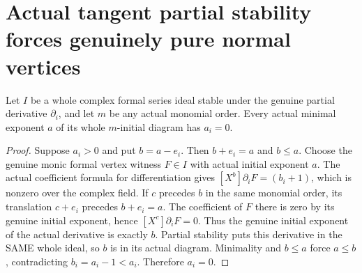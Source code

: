 \section{Actual tangent partial stability forces genuinely pure normal vertices}

\begin{theorem}
\label{hir:actual-pderiv-stable-vertex-coordinate-zero}
\leanok
Let $I$ be a whole complex formal series ideal stable under the genuine
partial derivative $\partial_i$, and let $m$ be any actual monomial order.
Every actual minimal exponent $a$ of its whole $m$-initial diagram has
$a_i=0$.
\end{theorem}
\begin{proof}
Suppose $a_i>0$ and put $b=a-e_i$. Then $b+e_i=a$ and $b\le a$.
Choose the genuine monic formal vertex witness $F\in I$ with actual initial
exponent $a$. The actual coefficient formula for differentiation gives
$[X^b]\partial_iF=(b_i+1)$, which is nonzero over the complex field. If
$c$ precedes $b$ in the same monomial order, its translation $c+e_i$
precedes $b+e_i=a$. The coefficient of $F$ there is zero by its genuine
initial exponent, hence $[X^c]\partial_iF=0$. Thus the genuine initial
exponent of the actual derivative is exactly $b$. Partial stability puts
this derivative in the SAME whole ideal, so $b$ is in its actual diagram.
Minimality and $b\le a$ force $a\le b$, contradicting
$b_i=a_i-1<a_i$. Therefore $a_i=0$.
\end{proof}

